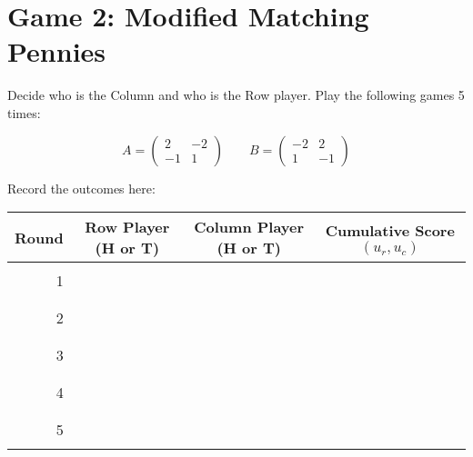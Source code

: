 \documentclass{article}
\begin{document}
\newpage
\section{Game 2: Modified Matching Pennies}

Decide who is the Column and who is the Row player. Play the following games 5 times:

$$
A=\begin{pmatrix}
    2  & -2\\
    -1 & 1
\end{pmatrix}
\qquad
B=\begin{pmatrix}
    -2 & 2\\
    1  & -1
\end{pmatrix}
$$


Record the outcomes here:

\begin{center}
\begin{tabular}{r|c|c|c}
\toprule
Round         & Row Player (H or T) & Column Player (H or T) & Cumulative Score $(u_r,u_c)$\\
\midrule
              &                     &                        & \\
1             &                     &                        & \\
              &                     &                        & \\
              &                     &                        & \\
2             &                     &                        & \\
              &                     &                        & \\
              &                     &                        & \\
3             &                     &                        & \\
              &                     &                        & \\
              &                     &                        & \\
4             &                     &                        & \\
              &                     &                        & \\
              &                     &                        & \\
5             &                     &                        & \\
              &                     &                        & \\
\bottomrule
\end{tabular}
\end{center}
\end{document}
